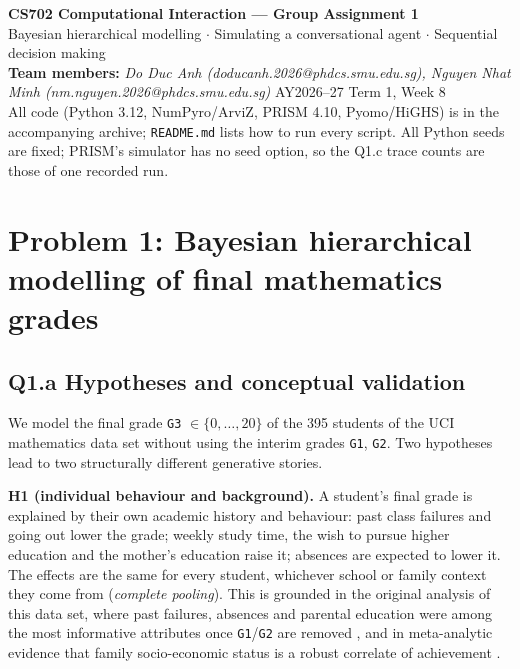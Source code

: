 \documentclass[10pt,a4paper]{article}
\newcommand{\code}[1]{\texttt{#1}}
\begin{document}
\begin{center}
{\LARGE\bfseries CS702 Computational Interaction --- Group Assignment 1}\\[4pt]
{\large Bayesian hierarchical modelling $\cdot$ Simulating a conversational agent $\cdot$ Sequential decision making}\\[5pt]
{\textbf{Team members:} \textit{Do Duc Anh (doducanh.2026@phdcs.smu.edu.sg), Nguyen Nhat Minh (nm.nguyen.2026@phdcs.smu.edu.sg)} \qquad AY2026--27 Term 1, Week 8}\\[3pt]
{\small All code (Python 3.12, NumPyro/ArviZ, PRISM 4.10, Pyomo/HiGHS) is in the accompanying archive; \code{README.md} lists how to run every script. All Python seeds are fixed; PRISM's simulator has no seed option, so the Q1.c trace counts are those of one recorded run.}
\end{center}
\vspace{-4pt}

\section{Problem 1: Bayesian hierarchical modelling of final mathematics grades}

\subsection{Q1.a Hypotheses and conceptual validation}
We model the final grade \code{G3} $\in\{0,\dots,20\}$ of the 395 students of the UCI mathematics data set without using the interim grades \code{G1}, \code{G2}. Two hypotheses lead to two structurally different generative stories.

\textbf{H1 (individual behaviour and background).} A student's final grade is explained by their own academic history and behaviour: past class failures and going out lower the grade; weekly study time, the wish to pursue higher education and the mother's education raise it; absences are expected to lower it. The effects are the same for every student, whichever school or family context they come from (\emph{complete pooling}). This is grounded in the original analysis of this data set, where past failures, absences and parental education were among the most informative attributes once \code{G1}/\code{G2} are removed \cite{cortez2008}, and in meta-analytic evidence that family socio-economic status is a robust correlate of achievement \cite{sirin2005}.
\end{document}
